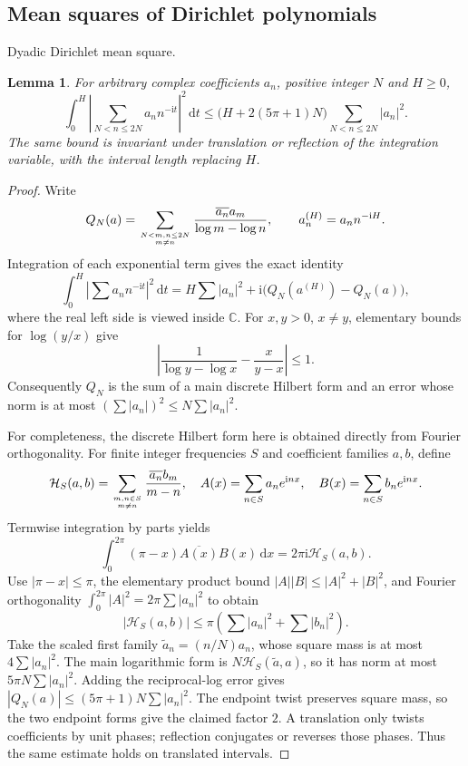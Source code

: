 \documentclass[11pt,a4paper]{article}
\numberwithin{equation}{section}
\newtheorem{lemma}[theorem]{Lemma}
\theoremstyle{definition}
\newcommand{\C}{\mathbb C}
\newcommand{\dd}{\,\mathrm d}
\newcommand{\ii}{\mathrm i}
\begin{document}
\subsection{Mean squares of Dirichlet polynomials}
\par\medskip\noindent Dyadic Dirichlet mean square.
\begin{lemma}\label{lem:meanvalue}
For arbitrary complex coefficients $a_n$, positive integer $N$ and $H\ge0$,
\[
 \int_0^H\left|\sum_{N<n\le2N}a_n n^{-\ii t}\right|^2\dd t
 \le\bigl(H+2(5\pi+1)N\bigr)\sum_{N<n\le2N}|a_n|^2.
\]
The same bound is invariant under translation or reflection of the integration
variable, with the interval length replacing $H$.
\end{lemma}
\begin{proof}
Write
\[
 Q_N(a)=\sum_{N<m,n\le2N\atop m\ne n}
 \frac{\overline{a_n}a_m}{\log m-\log n},\qquad
 a_n^{(H)}=a_n n^{-\ii H}.
\]
Integration of each exponential term gives the exact identity
\[
 \int_0^H\left|\sum a_n n^{-\ii t}\right|^2\dd t
 =H\sum|a_n|^2+\ii\bigl(Q_N(a^{(H)})-Q_N(a)\bigr),
\]
where the real left side is viewed inside $\C$.
For $x,y>0$, $x\ne y$, elementary bounds for $\log(y/x)$ give
\[
 \left|\frac1{\log y-\log x}-\frac{x}{y-x}\right|\le1.
\]
Consequently $Q_N$ is the sum of a main discrete Hilbert form and an error
whose norm is at most $(\sum|a_n|)^2\le N\sum|a_n|^2$.

For completeness, the discrete Hilbert form here is obtained directly from
Fourier orthogonality. For finite integer frequencies $S$ and coefficient
families $a,b$, define
\[
 \mathcal H_S(a,b)=\sum_{m,n\in S\atop m\ne n}
          \frac{\overline{a_n}b_m}{m-n},\quad
 A(x)=\sum_{n\in S}a_ne^{\ii nx},\quad B(x)=\sum_{n\in S}b_ne^{\ii nx}.
\]
Termwise integration by parts yields
\[
 \int_0^{2\pi}(\pi-x)\overline{A(x)}B(x)\dd x
     =2\pi\ii\mathcal H_S(a,b).
\]
Use $|\pi-x|\le\pi$, the elementary product bound
$|A||B|\le|A|^2+|B|^2$, and Fourier orthogonality
$\int_0^{2\pi}|A|^2=2\pi\sum|a_n|^2$ to obtain
\[
 |\mathcal H_S(a,b)|\le\pi\left(\sum|a_n|^2+\sum|b_n|^2\right).
\]
Take the scaled first family $\widetilde a_n=(n/N)a_n$, whose square mass is at most
$4\sum|a_n|^2$. The main logarithmic form is $N\mathcal H_S(\widetilde a,a)$,
so it has norm at most $5\pi N\sum|a_n|^2$. Adding the reciprocal-log error
gives $|Q_N(a)|\le(5\pi+1)N\sum|a_n|^2$. The endpoint twist preserves
square mass, so the two endpoint forms give the claimed factor $2$.
A translation only twists coefficients by unit phases; reflection conjugates
or reverses those phases. Thus the same estimate holds on translated intervals.
\end{proof}
\end{document}
